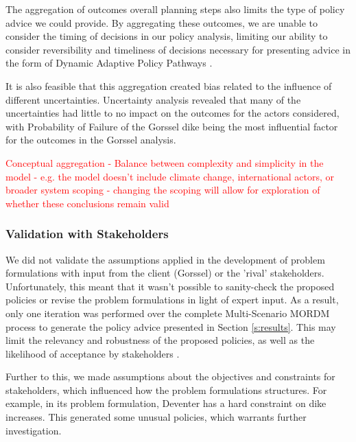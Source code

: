 The aggregation of outcomes overall planning steps also limits the type of policy advice we could provide. By aggregating these outcomes, we are unable to consider the timing of decisions in our policy analysis, limiting our ability to consider reversibility and timeliness of decisions necessary for presenting advice in the form of Dynamic Adaptive Policy Pathways \parencite{kwakkel_coping_2016, marchau_decision_2019}.

It is also feasible that this aggregation created bias related to the influence of different uncertainties. Uncertainty analysis revealed that many of the uncertainties had little to no impact on the outcomes for the actors considered, with Probability of Failure of the Gorssel dike being the most influential factor for the outcomes in the Gorssel analysis.

\textcolor{red}{Conceptual aggregation - Balance between complexity and simplicity in the model - e.g. the model doesn't include climate change, international actors, or broader system scoping - changing the scoping will allow for exploration of whether these conclusions remain valid}

\subsubsection{Validation with Stakeholders}
We did not validate the assumptions applied in the development of problem formulations with input from the client (Gorssel) or the 'rival' stakeholders. Unfortunately, this meant that it wasn't possible to sanity-check the proposed policies or revise the problem formulations in light of expert input. As a result, only one iteration was performed over the complete Multi-Scenario MORDM process to generate the policy advice presented in Section \ref{s:results}. This may limit the relevancy and robustness of the proposed policies, as well as the likelihood of acceptance by stakeholders \parencite{quinn_rival_2017}.

Further to this, we made assumptions about the objectives and constraints for stakeholders, which influenced how the problem formulations structures. For example, in its problem formulation, Deventer has a hard constraint on dike increases. This generated some unusual policies, which warrants further investigation.

